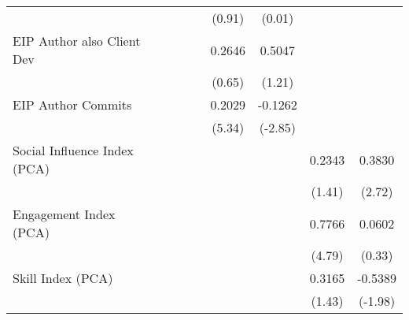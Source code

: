 {\begin{tabular}{l*{8}{c}}
                                   &                   &                   &                   &                   &    (0.91)         &    (0.01)         &                   &                   \\
[1em]
EIP Author also Client Dev         &                   &                   &                   &                   &    0.2646         &    0.5047         &                   &                   \\
                                   &                   &                   &                   &                   &    (0.65)         &    (1.21)         &                   &                   \\
[1em]
EIP Author Commits                 &                   &                   &                   &                   &    0.2029\sym{***}&   -0.1262\sym{***}&                   &                   \\
                                   &                   &                   &                   &                   &    (5.34)         &   (-2.85)         &                   &                   \\
[1em]
Social Influence Index (PCA)       &                   &                   &                   &                   &                   &                   &    0.2343         &    0.3830\sym{***}\\
                                   &                   &                   &                   &                   &                   &                   &    (1.41)         &    (2.72)         \\
[1em]
Engagement Index (PCA)             &                   &                   &                   &                   &                   &                   &    0.7766\sym{***}&    0.0602         \\
                                   &                   &                   &                   &                   &                   &                   &    (4.79)         &    (0.33)         \\
[1em]
Skill Index (PCA)                  &                   &                   &                   &                   &                   &                   &    0.3165         &   -0.5389\sym{**} \\
                                   &                   &                   &                   &                   &                   &                   &    (1.43)         &   (-1.98)         \\

\end{tabular}}
